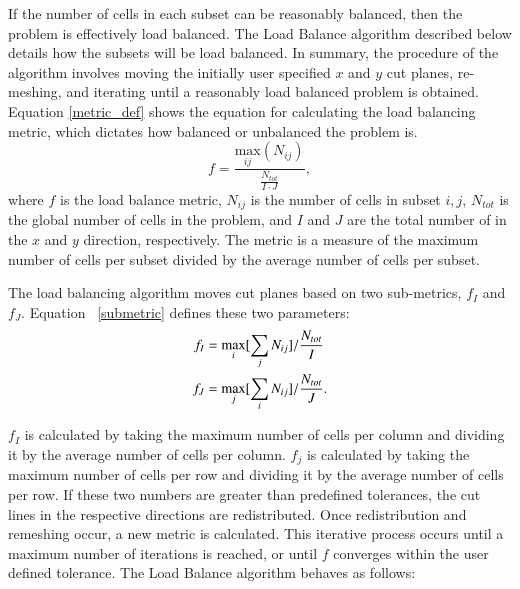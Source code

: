 \documentclass{anstrans}
\begin{document}
If the number of cells in each subset can be reasonably balanced, then the problem is effectively load balanced. The Load Balance algorithm described below details how the subsets will be load balanced. In summary, the procedure of the algorithm involves moving the initially user specified $x$ and $y$ cut planes, re-meshing, and iterating until a reasonably load balanced problem is obtained.  Equation \ref{metric_def} shows the equation for calculating the load balancing metric, which dictates how balanced or unbalanced the problem is.
\begin{equation}
f =\frac{\underset{ij}{\text{max}}(N_{ij})}{\frac{N_{tot}}{I\cdot J}},
\label{metric_def}
\end{equation}
where $f$ is the load balance metric, $N_{ij}$ is the number of cells in subset $i,j$, $N_{tot}$ is the global number of cells in the problem, and $I$ and $J$ are the total number of in the $x$ and $y$ direction, respectively. The metric is a measure of the maximum number of cells per subset divided by the average number of cells per subset.

The load balancing algorithm moves cut planes based on two sub-metrics, $f_I$ and $f_J$. Equation ~\eqref{submetric} defines these two parameters:
\begin{align}
f_I &= \underset{i}{\text{max}}[\sum_{j} N_{ij}]/\frac{N_{tot}}{I} \notag \\
f_J &= \underset{j}{\text{max}}[\sum_{i} N_{ij}]/\frac{N_{tot}}{J}.
\label{submetric}
\end{align}

$f_I$ is calculated by taking the maximum number of cells per column and dividing it by the average number of cells per column. $f_j$ is calculated by taking the maximum number of cells per row and dividing it by the average number of cells per row. If these two numbers are greater than predefined tolerances, the cut lines in the respective directions are redistributed. Once redistribution and remeshing occur, a new metric is calculated. This iterative process occurs until a maximum number of iterations is reached, or until $f$ converges within the user defined tolerance. The Load Balance algorithm behaves as follows:


\end{document}

